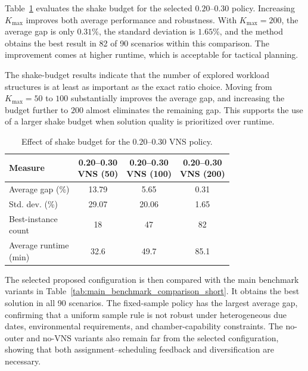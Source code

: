 \documentclass[11pt]{article}
\begin{document}
Table~\ref{tab:vns_budget_comparison_short} evaluates the shake budget for the selected \(0.20\)--\(0.30\) policy. Increasing \(K_{\max}\) improves both average performance and robustness. With \(K_{\max}=200\), the average gap is only \(0.31\%\), the standard deviation is \(1.65\%\), and the method obtains the best result in 82 of 90 scenarios within this comparison. The improvement comes at higher runtime, which is acceptable for tactical planning.

The shake-budget results indicate that the number of explored workload structures is at least as important as the exact ratio choice. Moving from \(K_{\max}=50\) to \(100\) substantially improves the average gap, and increasing the budget further to \(200\) almost eliminates the remaining gap. This supports the use of a larger shake budget when solution quality is prioritized over runtime.

\begin{table}[H]
\centering
\caption{Effect of shake budget for the \(0.20\)--\(0.30\) VNS policy.}
\label{tab:vns_budget_comparison_short}
\begin{tabular}{lccc}
\hline
\textbf{Measure}
& \shortstack{\textbf{0.20--0.30}\\\textbf{VNS (50)}}
& \shortstack{\textbf{0.20--0.30}\\\textbf{VNS (100)}}
& \shortstack{\textbf{0.20--0.30}\\\textbf{VNS (200)}} \\
\hline
Average gap (\%) & 13.79 & 5.65 & 0.31 \\
Std. dev. (\%) & 29.07 & 20.06 & 1.65 \\
\shortstack[l]{Best-instance\\count} & 18 & 47 & 82 \\
\shortstack[l]{Average runtime\\(min)} & 32.6 & 49.7 & 85.1 \\
\hline
\end{tabular}
\end{table}

The selected proposed configuration is then compared with the main benchmark variants in Table~\ref{tab:main_benchmark_comparison_short}. It obtains the best solution in all 90 scenarios. The fixed-sample policy has the largest average gap, confirming that a uniform sample rule is not robust under heterogeneous due dates, environmental requirements, and chamber-capability constraints. The no-outer and no-VNS variants also remain far from the selected configuration, showing that both assignment--scheduling feedback and diversification are necessary.
\end{document}
